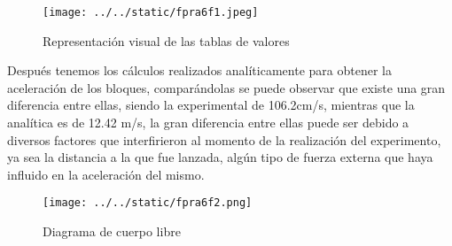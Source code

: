 \documentclass{article}
\begin{document}
\begin{figure}[H]
	\centering
	\texttt{[image: ../../static/fpra6f1.jpeg]}	
	\caption{Representación visual de las tablas de valores}
	\label{fig:1}
\end{figure}

Después tenemos los cálculos realizados analíticamente para obtener la aceleración de los bloques, comparándolas se puede observar que existe una gran diferencia entre ellas, siendo la experimental de 106.2cm/s, mientras que la analítica es de 12.42 m/s, la gran diferencia entre ellas puede ser debido a diversos factores que interfirieron al momento de la realización del experimento, ya sea la distancia a la que fue lanzada, algún tipo de fuerza externa que haya influido en la aceleración del mismo.

\begin{figure}[H]
	\centering
	\texttt{[image: ../../static/fpra6f2.png]}
	\caption{Diagrama de cuerpo libre}
	\label{fig:2}
\end{figure}
\end{document}
